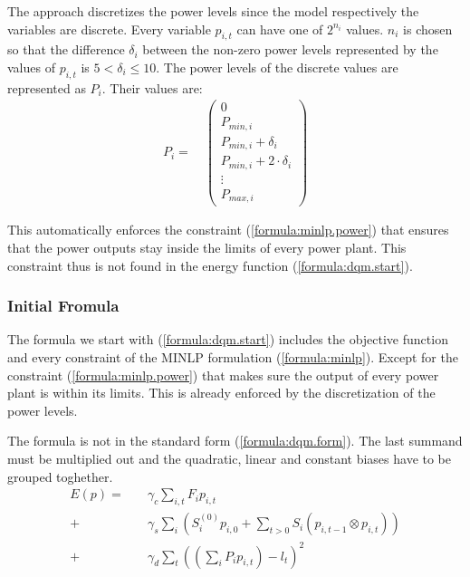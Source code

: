 The approach discretizes the power levels since the model respectively the variables are discrete.
Every variable $p_{i, t}$ can have one of $2^{n_i}$ values.
$n_i$ is chosen so that the difference $\delta_i$ between the non-zero power levels represented by the values of $p_{i, t}$ is $5 < \delta_i \leq 10$.
The power levels of the discrete values are represented as $P_i$.
Their values are:
\begin{align}
  P_i =
  \quad \begin{pmatrix}
    0 \\
    P_{min, i} \\
    P_{min, i} + \delta_i \\
    P_{min, i} + 2 \cdot \delta_i \\
    \vdots \\
    P_{max, i}
  \end{pmatrix}
\end{align}

This automatically enforces the constraint (\ref{formula:minlp.power}) that ensures that the power outputs stay inside the limits of every power plant.
This constraint thus is not found in the energy function (\ref{formula:dqm.start}).

\subsubsection{Initial Fromula}
\label{approach:annealing.formulate}

The formula we start with (\ref{formula:dqm.start}) includes the objective function and every constraint of the MINLP formulation (\ref{formula:minlp}).
Except for the constraint (\ref{formula:minlp.power}) that makes sure the output of every power plant is within its limits.
This is already enforced by the discretization of the power levels.

The formula is not in the standard form (\ref{formula:dqm.form}).
The last summand must be multiplied out and the quadratic, linear and constant biases have to be grouped toghether.
\begin{subequations}
\label{formula:dqm.start}
\begin{align}
  E(p) =
  &  \quad \gamma_c \sum_{i, t} F_i p_{i, t}
  \label{formula:dqm.start.obj} \\
  + & \quad \gamma_s \sum_i \left(
      S_i^{(0)} p_{i, 0}
      + \sum_{t > 0} S_i \left( p_{i, t-1} \otimes p_{i, t} \right)
    \right)
  \label{formula:dqm.start.startup} \\
  + & \quad \gamma_d \sum_t \left( \left( \sum_i P_i p_{i, t} \right) - l_t \right)^2
  \label{formula:dqm.start.demand}
\end{align}
\end{subequations}

